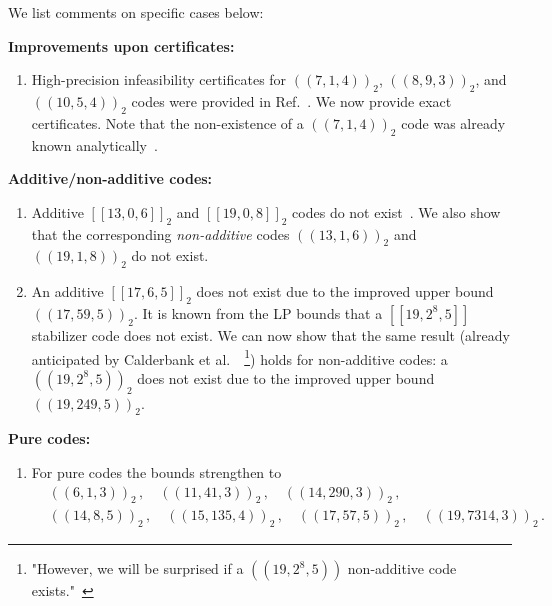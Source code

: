 \documentclass[12pt,a4paper]{amsart}
\newcommand{\nn}{\nonumber}
\begin{document}
\bigskip
We list comments on specific cases below:

\smallskip
{\bf Improvements upon certificates:}
\begin{enumerate}
\setlength{\itemsep}{3pt}
\item[(a)]
%
High-precision infeasibility certificates for 
$(\!(7,1,4)\!)_2$,
$(\!(8,9,3)\!)_2$,
and 
$(\!(10,5,4)\!)_2$ codes
were provided in Ref.~\cite[Appendix B]{munne2025sdpboundsquantumcodes}. 
We now provide exact certificates.
%
Note that the non-existence of a $(\!(7,1,4)\!)_2$ code was already known analytically~\cite{PhysRevLett.118.200502}.

\end{enumerate}

\smallskip
{\bf Additive/non-additive codes:}
\begin{enumerate}\setlength{\itemsep}{3pt}

\item[(b)] 
Additive $[\![13,0,6]\!]_2$ and $[\![19,0,8]\!]_2$ codes do not exist~\cite{681315}. 
We also show that the corresponding 
{\it non-additive} codes
$(\!(13,1,6)\!)_2$ and $(\!(19,1,8)\!)_2$
do not exist.

\item[(c)] 
An additive $[\![17, 6, 5]\!]_2$ does not exist due to the improved upper bound $(\!(17,59,5)\!)_2$.
%
It is known from the LP bounds that a 
$[\![19, 2^8, 5]\!]$ stabilizer code does not exist. 
We can now show that the same result (already anticipated
by Calderbank et al.~\cite{681315}~\footnote{
"However, we will be surprised if a $(\!(19, 2^8, 5)\!)$ non-additive code exists."~\cite{681315}})
holds for non-additive codes: 
a $(\!(19, 2^8, 5)\!)_2$ does not exist due to 
the improved upper bound $(\!(19, 249, 5)\!)_2$. 
%

\end{enumerate}


\smallskip
{\bf Pure codes:}
\begin{enumerate}\setlength{\itemsep}{3pt}
\item[(d)] For pure codes the bounds strengthen to
% 
\begin{align}\label{eq:pure_inf}
 &(\!(6,1,3)\!)_2 \,,  \quad  (\!(11,41,3)\!)_2 \,,  \quad  (\!(14,290,3)\!)_2 \,,  \nn \\
&(\!(14,8,5)\!)_2 \,,   \quad  (\! (15,135,4)\!)_2\,, \quad (\!(17,57,5)\!)_2 \,, \quad (\!(19,7314,3)\!)_2 \,.
\end{align}
\end{enumerate}
\end{document}
